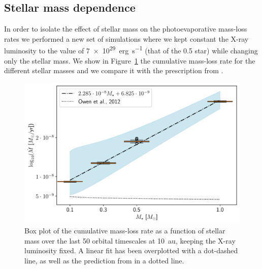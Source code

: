 \documentclass[usenatbib,useAMS,usedcolumn]{mnras}
\begin{document}
\subsection{Stellar mass dependence}\label{sec:mass-dependance}
In order to isolate the effect of stellar mass on the photoevaporative mass-loss rates we performed a new set of simulations where we kept constant the X-ray luminosity to the value of \SI{7e29}{erg.s^{-1}} (that of the \SI{0.5}{\solarmass} star) while changing only the stellar mass.
We show in Figure~\ref{fig:cumdotMtest} the cumulative mass-loss rate for the different stellar masses and we compare it with the prescription from .
\begin{figure}
  \centering
  \includegraphics[width=\columnwidth]{Figure8}
  \caption{Box plot of the cumulative mass-loss rate as a function of stellar mass over the last 50 orbital timescales at \SI{10}{\astronomicalunit}, keeping the X-ray luminosity fixed. A linear fit has been overplotted with a dot-dashed line, as well as the prediction from  in a dotted line. \label{fig:cumdotMtest}}
\end{figure}
\end{document}

